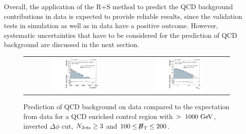 Overall, the application of the R+S method to predict the QCD background contributions in data is expected to provide reliable results, since the validation tests in simulation as well as in data have a positive outcome. However, systematic uncertainties that have to be considered for the prediction of QCD background are discussed in the next section. 
\begin{figure}[!t]
  \centering
  \begin{tabular}{cc}
                \includegraphics[width=0.49\textwidth]{figures/HT_presel_HThigh_data_DR53X_chs_HThigh_invertedDeltaPhi_v1.pdf} &
                \includegraphics[width=0.49\textwidth]{figures/NJets_presel_HThigh_data_DR53X_chs_HThigh_invertedDeltaPhi_v1.pdf} \\
  \end{tabular}
  \caption{Prediction of QCD background on data compared to the expectation from data for a QCD enriched control region with \HT$>~1000~\rm{GeV}$, inverted $\Delta \phi$ cut, $N_{\text{Jets}} \geq 3$ and $100 \leq \slash\mkern-12mu{H}_{\text{T}} \leq 200$\gev.}
  \label{fig:qcd_rs_dataclosure}
\end{figure}

